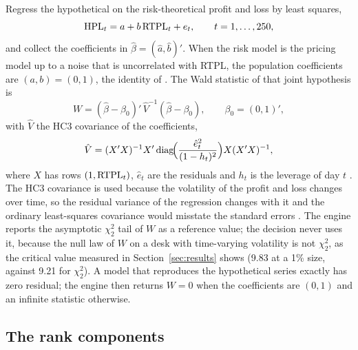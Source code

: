 Regress the hypothetical on the risk-theoretical profit and loss by least squares,
\begin{equation}
\mathrm{HPL}_t=a+b\,\mathrm{RTPL}_t+e_t,\qquad t=1,\dots,250,
\label{eq:mz}
\end{equation}
and collect the coefficients in $\hat\beta=(\hat a,\hat b)'$.
When the risk model is the pricing model up to a noise that is uncorrelated with RTPL, the population coefficients are $(a,b)=(0,1)$, the identity of \citet{mincer1969}.
The Wald statistic of that joint hypothesis is
\begin{equation}
W=(\hat\beta-\beta_0)'\,\hat V^{-1}(\hat\beta-\beta_0),\qquad \beta_0=(0,1)',
\label{eq:wald}
\end{equation}
with $\hat V$ the HC3 covariance of the coefficients,
\begin{equation}
\hat V=(X'X)^{-1}X'\operatorname{diag}\!\Bigl(\frac{\hat e_t^{2}}{(1-h_t)^{2}}\Bigr)X(X'X)^{-1},
\label{eq:hc3}
\end{equation}
where $X$ has rows $(1,\mathrm{RTPL}_t)$, $\hat e_t$ are the residuals and $h_t$ is the leverage of day $t$ \citep{mackinnon1985}.
The HC3 covariance is used because the volatility of the profit and loss changes over time, so the residual variance of the regression changes with it and the ordinary least-squares covariance would misstate the standard errors \citep{white1980}.
The engine reports the asymptotic $\chi^2_2$ tail of $W$ as a reference value; the decision never uses it, because the null law of $W$ on a desk with time-varying volatility is not $\chi^2_2$, as the critical value measured in Section~\ref{sec:results} shows (9.83 at a 1\% size, against 9.21 for $\chi^2_2$).
A model that reproduces the hypothetical series exactly has zero residual; the engine then returns $W=0$ when the coefficients are $(0,1)$ and an infinite statistic otherwise.

\subsection{The rank components}
\label{sec:method-rank}

